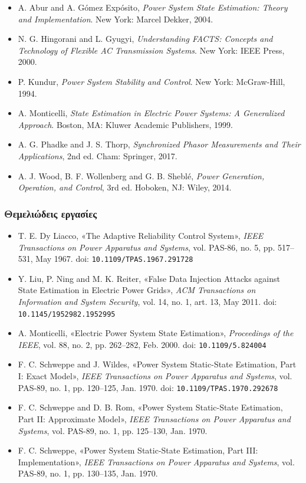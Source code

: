 \begin{itemize}
\item A. Abur and A. Gómez Expósito, \textit{Power System State Estimation: Theory and
      Implementation}. New York: Marcel Dekker, 2004.
\item N. G. Hingorani and L. Gyugyi, \textit{Understanding FACTS: Concepts and Technology of
      Flexible AC Transmission Systems}. New York: IEEE Press, 2000.
\item P. Kundur, \textit{Power System Stability and Control}. New York: McGraw-Hill, 1994.
\item A. Monticelli, \textit{State Estimation in Electric Power Systems: A Generalized
      Approach}. Boston, MA: Kluwer Academic Publishers, 1999.
\item A. G. Phadke and J. S. Thorp, \textit{Synchronized Phasor Measurements and Their
      Applications}, 2nd ed. Cham: Springer, 2017.
\item A. J. Wood, B. F. Wollenberg and G. B. Sheblé, \textit{Power Generation, Operation, and
      Control}, 3rd ed. Hoboken, NJ: Wiley, 2014.
\end{itemize}

\subsubsection*{Θεμελιώδεις εργασίες}

\begin{itemize}
\item T. E. Dy Liacco, «The Adaptive Reliability Control System», \textit{IEEE Transactions
      on Power Apparatus and Systems}, vol. PAS-86, no. 5, pp. 517--531, May 1967.
      doi: \texttt{10.1109/TPAS.1967.291728}
\item Y. Liu, P. Ning and M. K. Reiter, «False Data Injection Attacks against State
      Estimation in Electric Power Grids», \textit{ACM Transactions on Information and System
      Security}, vol. 14, no. 1, art. 13, May 2011.
      doi: \texttt{10.1145/1952982.1952995}
\item A. Monticelli, «Electric Power System State Estimation», \textit{Proceedings of the
      IEEE}, vol. 88, no. 2, pp. 262--282, Feb. 2000.
      doi: \texttt{10.1109/5.824004}
\item F. C. Schweppe and J. Wildes, «Power System Static-State Estimation, Part I: Exact
      Model», \textit{IEEE Transactions on Power Apparatus and Systems}, vol. PAS-89, no. 1,
      pp. 120--125, Jan. 1970. doi: \texttt{10.1109/TPAS.1970.292678}
\item F. C. Schweppe and D. B. Rom, «Power System Static-State Estimation, Part II:
      Approximate Model», \textit{IEEE Transactions on Power Apparatus and Systems},
      vol. PAS-89, no. 1, pp. 125--130, Jan. 1970.
\item F. C. Schweppe, «Power System Static-State Estimation, Part III: Implementation»,
      \textit{IEEE Transactions on Power Apparatus and Systems}, vol. PAS-89, no. 1,
      pp. 130--135, Jan. 1970.
\end{itemize}

